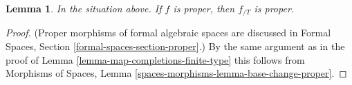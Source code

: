 \documentclass[10pt,a4paper]{amsart}
\theoremstyle{plain}
\newtheorem{lemma}[subsection]{Lemma}
\theoremstyle{definition}
\theoremstyle{remark}
\numberwithin{equation}{subsection}
\begin{document}
\begin{lemma}
\label{lemma-proper-gives-proper}
In the situation above. If $f$ is proper, then $f_{/T}$ is proper.
\end{lemma}

\begin{proof}
(Proper morphisms of formal algebraic spaces are discussed in
Formal Spaces, Section \ref{formal-spaces-section-proper}.)
By the same argument as in the proof of
Lemma \ref{lemma-map-completions-finite-type} this follows from
Morphisms of Spaces, Lemma
\ref{spaces-morphisms-lemma-base-change-proper}.
\end{proof}
\end{document}
